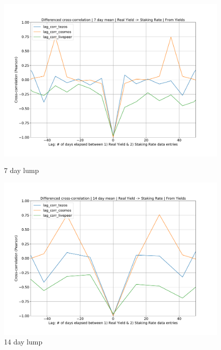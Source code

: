 \documentclass[longbibliography,nofootinbib]{revtex4-1}
\begin{document}
\begin{figure}[h!]
 \centering
    \begin{minipage}{0.5\textwidth}
        \centering
        \includegraphics[width=1\textwidth]{graphs/CrossCorr_Yields_DIF_7.pdf}
        \caption{7 day lump}
    \end{minipage}\hfill
    \begin{minipage}{0.5\textwidth}
        \centering
        \includegraphics[width=1\textwidth]{graphs/CrossCorr_Yields_DIF_14.pdf}
        \caption{14 day lump}
    \end{minipage}
    \begin{minipage}{0.5\textwidth}
        \centering

\end{minipage}
\end{figure}
\end{document}
